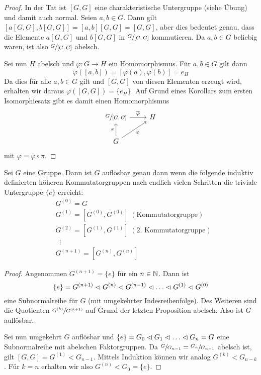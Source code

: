 \begin{proof}
	In der Tat ist $[G,G]$ eine charakteristische Untergruppe (siehe Übung) und damit auch normal.
	Seien $a,b \in G$. Dann gilt $[a [G,G], b [G,G]] = [a,b][G,G] = [G,G]$, aber dies bedeutet genau,
	dass die Elemente $a[G,G]$ und $b[G,G]$ in $\sfrac{G}{[G,G]}$ kommutieren.
	Da $a,b \in G$ beliebig waren, ist also $\sfrac{G}{[G,G]}$ abelsch.

	Sei nun $H$ abelsch und $\varphi: G \to H$ ein Homomorphismus. Für $a,b \in G$ gilt dann
	\[
		\varphi([a,b]) = [\varphi(a), \varphi(b)] = e_{H}
	\]
	Da dies für alle $a,b \in G$ gilt und $[G,G]$ von diesen Elementen erzeugt wird, erhalten wir daraus
	$\varphi([G,G]) = \{e_{H}\}$. Auf Grund eines Korollars zum ersten Isomorphiesatz gibt es damit
	einen Homomorphismus
	\[
		\begin{tikzcd}
			{\sfrac{G}{[G,G]}} \arrow[r, "\overline{\varphi}"] & H \\
			G \arrow[u, "\pi"] \arrow[ru, "\varphi"']          &  
		\end{tikzcd}
	\] 
	mit $\varphi = \overline{\varphi} \circ \pi$.
\end{proof}

\begin{proposition}
	Sei $G$ eine Gruppe. Dann ist $G$ auflösbar genau dann wenn die folgende induktiv definierten
	höheren Kommutatorgruppen nach endlich vielen Schritten die triviale Untergruppe $\{e\}$ erreicht:
	\begin{align*}
		&G^{(0)} = G \\
		&G^{(1)} = [G^{(0)}, G^{(0)}] \;(\text{Kommutatorgruppe})\\
		&G^{(2)} = [G^{(1)}, G^{(1)}] \;(\text{2. Kommutatorgruppe})\\
		&\;\;\vdots \\
		&G^{(n+1)} = [G^{(n)}, G^{(n)}]
	\end{align*}
\end{proposition}

\begin{proof}
	Angenommen $G^{(n+1)} = \{e\}$ für ein $n \in \mathbb{N}$. Dann ist
	\[
	\{e\} = G^{(n+1)} \vartriangleleft G^{(n)} \vartriangleleft G^{(n-1)} \vartriangleleft \ldots \vartriangleleft G^{(1)} \vartriangleleft G^{(0)}
	\] 
	eine Subnormalreihe für $G$ (mit umgekehrter Indesreihenfolge).
	Des Weiteren sind die Quotienten $\sfrac{G^{(k)}}{G^{(k+1)}}$ auf Grund der letzten Proposition abelsch.
	Also ist $G$ auflösbar.

	Sei nun umgekehrt $G$ auflösbar und $\{e\} = G_0 \vartriangleleft G_1 \vartriangleleft \ldots \vartriangleleft G_{n} = G$ eine Subnormalreihe mit abelschen Faktorgruppen.
	Da $\sfrac{G}{G_{n-1}} = \sfrac{G_{n}}{G_{n-1}}$ abelsch ist, gilt $[G,G] = G^{(1)} < G_{n-1}$.
	Mittels Induktion können wir analog $G^{(k)} < G_{n-k}$.
	Für $k = n$ erhalten wir also $G^{(n)} < G_0 = \{e\}$.
\end{proof}

